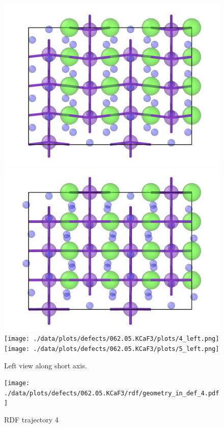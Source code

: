 \begin{figure}
	\includegraphics[width=.5\textwidth]{./data/plots/defects/062.05.KCaF3/plots/ref_left.png} \hfill
	\includegraphics[width=.5\textwidth]{./data/plots/defects/062.05.KCaF3/plots/2_left.png} \\
	\texttt{[image: ./data/plots/defects/062.05.KCaF3/plots/4\_left.png]} \hfill
	\texttt{[image: ./data/plots/defects/062.05.KCaF3/plots/5\_left.png]}
	\caption{Left view along short axis.}
	\label{}
\end{figure}

\begin{figure}
	\texttt{[image: ./data/plots/defects/062.05.KCaF3/rdf/geometry\_in\_def\_4.pdf]}
	\caption{RDF trajectory 4}
	\label{}
\end{figure}
